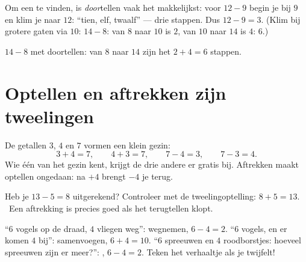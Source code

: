\begin{method}[Doortellen]\label{met:g1:subtraction:countup}
Om een  te vinden, is \emph{door}tellen vaak het makkelijkst:
voor $12 - 9$ begin je bij $9$ en klim je naar $12$: ``tien, elf,
twaalf'' --- drie stappen. Dus $12 - 9 = 3$. (Klim bij grotere gaten
via $10$: $14 - 8$: van $8$ naar $10$ is $2$, van $10$ naar $14$ is
$4$:  $6$.)
\end{method}

\begin{omfigure}

{\small $14 - 8$ met doortellen: van $8$ naar $14$ zijn het
$2 + 4 = 6$ stappen.}
\end{omfigure}

\section{Optellen en aftrekken zijn tweelingen}

\begin{example}[Rekenfamilies]\label{ex:g1:subtraction:family}
De getallen $3$, $4$ en $7$ vormen een klein gezin:
\[
3 + 4 = 7, \qquad
4 + 3 = 7, \qquad
7 - 4 = 3, \qquad
7 - 3 = 4 .
\]
Wie één  van het gezin kent, krijgt de drie andere er gratis bij.
Aftrekken maakt optellen ongedaan: na $+4$ brengt $-4$ je terug.
\end{example}

\begin{example}[Controleren]\label{ex:g1:subtraction:check}
Heb je $13 - 5 = 8$ uitgerekend? Controleer met de tweelingoptelling:
$8 + 5 = 13$. \checkmark\ Een aftrekking is precies goed als het
terugtellen klopt.
\end{example}

\begin{example}\label{ex:g1:subtraction:choose}
``$6$ vogels op de draad, $4$ vliegen weg'': wegnemen, $6 - 4 = 2$.
``$6$ vogels, en er komen $4$ bij'': samenvoegen, $6 + 4 = 10$.
``$6$ spreeuwen en $4$ roodborstjes: hoeveel spreeuwen zijn er meer?'':
, $6 - 4 = 2$. Teken het verhaaltje als je twijfelt!
\end{example}

